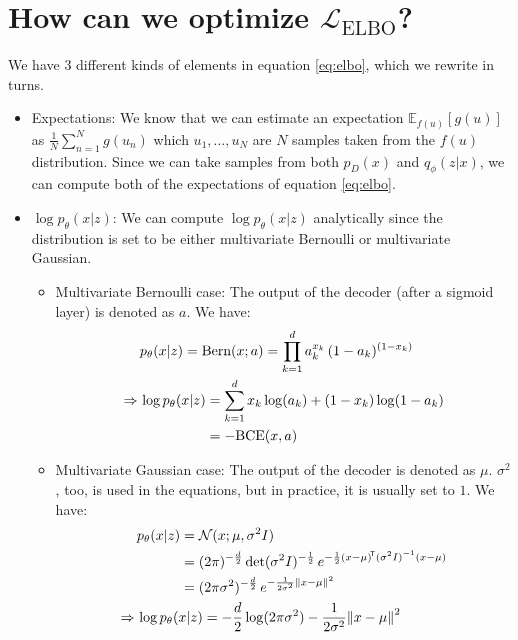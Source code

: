 \documentclass{article}
\newcommand{\nm}{\Rightarrow \,}
\begin{document}
\section{How can we optimize \texorpdfstring{$\mathcal{L}_\text{ELBO}$}{ELBO}?}
We have 3 different kinds of elements in equation \ref{eq:elbo}, which we rewrite in turns.
\begin{itemize}
	\item Expectations:
		We know that we can estimate an expectation $\mathbb{E}_{f(u)}[g(u)]$ as $\frac{1}{N} \sum_{n=1}^{N} g(u_n)$ which $u_1, \dots, u_N$ are $N$ samples taken from the $f(u)$ distribution. Since we can take samples from both $p_D(x)$ and $q_\phi(z|x)$, we can compute both of the expectations of equation \ref{eq:elbo}.
	\item $\log p_\theta(x|z)$:
		We can compute $\log p_\theta(x|z)$ analytically since the distribution is set to be either multivariate Bernoulli or multivariate Gaussian.
		\begin{itemize}
			\item Multivariate Bernoulli case: The output of the decoder (after a sigmoid layer) is denoted as $a$. We have:
				\begin{equation}
					\begin{alignedat}{4}
						& p_\theta (x | z) = \text{Bern}(x; a) = \prod_{k=1}^{d} a_k^{x_k}\, (1-a_k)^{(1-x_k)} \span \span \\
						\nm & \log p_\theta (x | z) && = \sum_{k=1}^{d} x_k \log(a_k) + (1-x_k) \log(1-a_k) \\
						&&& = - \text{BCE}(x, a)
					\end{alignedat}
				\end{equation}
			\item  Multivariate Gaussian case: The output of the decoder is denoted as $\mu$. $\sigma^2$, too, is used in the equations, but in practice, it is usually set to $1$. We have:
				\begin{equation}
					\begin{alignedat}{6}
						& p_\theta (x | z) && = \mathcal{N}(x; \mu, \sigma^2 I) \span \span \\
						&&& = (2 \pi )^{-{\frac {d}{2}}} \det({\sigma^2 I})^{-{\frac {1}{2}}} \, e^{ -{\frac {1}{2}} (x -{\mu})^{\!{\mathsf {T}}}{(\sigma^2 I)}^{-1}(x -{\mu}) } \span \span \\
						&&& = (2 \pi \sigma^2)^{-{\frac {d}{2}}} \, e^{ -{\frac {1}{2 \sigma^2}} {\Vert x -\mu \Vert}^2 } \span \span \\
						\nm & \span \span \log p_\theta (x | z) && = -{\frac {d}{2}} \log(2 \pi \sigma^2) - {\frac {1}{2 \sigma^2}} {\Vert x - \mu \Vert}^2 \\

\end{alignedat}
\end{equation}
\end{itemize}
\end{itemize}
\end{document}
